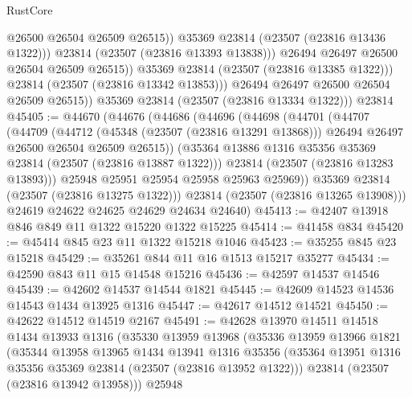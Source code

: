 \begin{lexlean}{RustCore}
\begin{coremodule}
                          @26500
                          @26504
                          @26509
                          @26515))
                      @35369
                      @23814
                      (@23507 (@23816 @13436 @1322)))
                    @23814
                    (@23507 (@23816 @13393 @13838)))
                  @26494
                  @26497
                  @26500
                  @26504
                  @26509
                  @26515))
              @35369
              @23814
              (@23507 (@23816 @13385 @1322)))
            @23814
            (@23507 (@23816 @13342 @13853)))
          @26494
          @26497
          @26500
          @26504
          @26509
          @26515))
      @35369
      @23814
      (@23507 (@23816 @13334 @1322)))
    @23814
@45405 := @44670
    (@44676
      (@44686
        (@44696
          (@44698
            (@44701
              (@44707
                (@44709
                  (@44712
                    (@45348 (@23507 (@23816 @13291 @13868)))
                    @26494
                    @26497
                    @26500
                    @26504
                    @26509
                    @26515))
                (@35364 @13886 @1316 @35356 @35369 @23814 (@23507 (@23816 @13887 @1322)))
                @23814
                (@23507 (@23816 @13283 @13893)))
              @25948
              @25951
              @25954
              @25958
              @25963
              @25969))
          @35369
          @23814
          (@23507 (@23816 @13275 @1322)))
        @23814
        (@23507 (@23816 @13265 @13908)))
      @24619
      @24622
      @24625
      @24629
      @24634
      @24640)
@45413 := @42407 @13918 @846 @849 @11 @1322 @15220 @1322 @15225
@45414 := @41458 @834
@45420 := @45414 @845 @23 @11 @1322 @15218 @1046
@45423 := @35255 @845 @23 @15218
@45429 := @35261 @844 @11 @16 @1513 @15217 @35277
@45434 := @42590 @843 @11 @15 @14548 @15216
@45436 := @42597 @14537 @14546
@45439 := @42602 @14537 @14544 @1821
@45445 := @42609 @14523 @14536 @14543 @1434 @13925 @1316
@45447 := @42617 @14512 @14521
@45450 := @42622 @14512 @14519 @2167
@45491 := @42628
    @13970
    @14511
    @14518
    @1434
    @13933
    @1316
    (@35330
      @13959
      @13968
      (@35336
        @13959
        @13966
        @1821
        (@35344
          @13958
          @13965
          @1434
          @13941
          @1316
          @35356
          (@35364 @13951 @1316 @35356 @35369 @23814 (@23507 (@23816 @13952 @1322)))
          @23814
          (@23507 (@23816 @13942 @13958)))
        @25948

\end{coremodule}
\end{lexlean}
